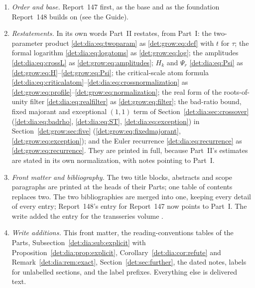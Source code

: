 \documentclass[11pt,letterpaper]{article}
\numberwithin{equation}{section}
\theoremstyle{definition}\newtheorem{definition}[theorem]{Definition}
\theoremstyle{remark}\newtheorem{remark}[theorem]{Remark}
\begin{document}
\begin{enumerate}
\item \emph{Order and base.} Report~147 first, as the base and as the foundation Report~148 builds on (see the Guide).
\item \emph{Restatements.} In its own words Part~II restates, from Part~I: the two-parameter product \eqref{det:dia:eq:twoparam} as \eqref{det:grow:eq:def} with $t$ for $\tau$; the formal logarithm \eqref{det:dia:eq:logatoms} as \eqref{det:grow:eq:log}; the amplitudes \eqref{det:dia:eq:crossL} as \eqref{det:grow:eq:amplitudes}; $H_k$ and $\Psi_r$ \eqref{det:dia:eq:Psi} as \eqref{det:grow:eq:H}--\eqref{det:grow:eq:Psi}; the critical-scale atom formula \eqref{det:dia:eq:criticalatom}--\eqref{det:dia:eq:crossnormalization} as \eqref{det:grow:eq:profile}--\eqref{det:grow:eq:normalization}; the real form of the roots-of-unity filter \eqref{det:dia:eq:realfilter} as \eqref{det:grow:eq:filter}; the bad-ratio bound, fixed majorant and exceptional $(1,1)$ term of Section~\ref{det:dia:sec:crossover} (\eqref{det:dia:eq:badrho}, \eqref{det:dia:eq:ST}, \eqref{det:dia:eq:exception}) in Section~\ref{det:grow:sec:five} (\eqref{det:grow:eq:fixedmajorant}, \eqref{det:grow:eq:exception}); and the Euler recurrence \eqref{det:dia:eq:recurrence} as \eqref{det:grow:eq:recurrence}. They are printed in full, because Part~II's estimates are stated in its own normalization, with notes pointing to Part~I.
\item \emph{Front matter and bibliography.} The two title blocks, abstracts and scope paragraphs are printed at the heads of their Parts; one table of contents replaces two. The two bibliographies are merged into one, keeping every detail of every entry; Report~148's entry for Report~147 now points to Part~I. The write added the entry for the transseries volume \cite{TSvol}.
\item \emph{Write additions.} This front matter, the reading-conventions tables of the Parts, Subsection~\ref{det:dia:sub:explicit} with Proposition~\ref{det:dia:prop:explicit}, Corollary~\ref{det:dia:cor:refute} and Remark~\ref{det:dia:rem:exact}, Section~\ref{det:sec:further}, the dated notes, labels for unlabelled sections, and the label prefixes. Everything else is delivered text.
\end{enumerate}
\end{document}
